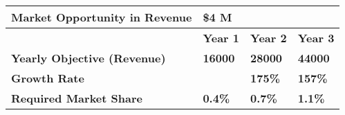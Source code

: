 \begin{table}[!H]
\begin{tabular}{|l|l|l|l|}
\hline
\cellcolor[HTML]{23BAB3}\textbf{Market Opportunity in Revenue} & \multicolumn{3}{l|}{\textbf{\$4 M}}                                                                                         \\ \hline
                                                               & \cellcolor[HTML]{529BB6}\textbf{Year 1} & \cellcolor[HTML]{529BB6}\textbf{Year 2} & \cellcolor[HTML]{529BB6}\textbf{Year 3} \\ \hline
\cellcolor[HTML]{23BAB3}\textbf{Yearly Objective (Revenue)}    & \textbf{16000}                          & \textbf{28000}                          & \textbf{44000}                          \\ \hline
\cellcolor[HTML]{23BAB3}\textbf{Growth Rate}                   & \textbf{}                               & \textbf{175\%}                          & \textbf{157\%}                          \\ \hline
\cellcolor[HTML]{23BAB3}\textbf{Required Market Share}         & \textbf{0.4\%}                          & \textbf{0.7\%}                          & \textbf{1.1\%}                          \\ \hline
\end{tabular}
\end{table}
